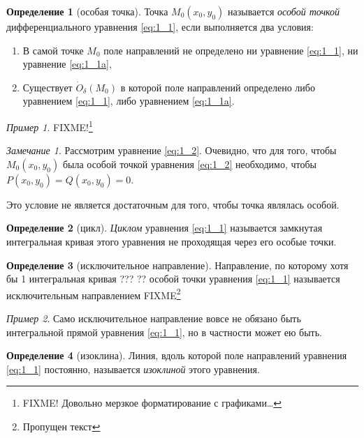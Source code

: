 \documentclass[a4paper,10pt]{report}
\newcommand{\new}[2]{\emph{#1}\index{#2}}
\theoremstyle{definition}
\newtheorem{definition}{Определение}[section]
\theoremstyle{remark}
\newtheorem{note}{Замечание}[section]
\newtheorem{example}{Пример}[section]
\theoremstyle{plain}
\begin{document}
\begin{definition}[особая точка]
 Точка $M_0(x_0,y_0)$ называется \new{особой точкой}{Особая точка} дифференциального уравнения \eqref{eq:1_1}, если выполняется два условия:
 \begin{enumerate}
  \item В самой точке $M_0$ поле направлений не определено ни уравнение \eqref{eq:1_1}, ни уравнение \eqref{eq:1_1a},
  \item Существует $\dot{O}_\delta(M_0)$ в которой поле направлений определено либо уравнением \eqref{eq:1_1}, либо уравнением \eqref{eq:1_1a}.
 \end{enumerate}
\end{definition}

\begin{example}
  FIXME!\footnote{FIXME! Довольно мерзкое форматирование с графиками\ldots}
\end{example}

\begin{note}
 Рассмотрим уравнение \eqref{eq:1_2}. Очевидно, что для того, чтобы $M_0(x_0,y_0)$ была особой точкой уравнения \eqref{eq:1_2} необходимо, чтобы $P(x_0,y_0) = Q(x_0,y_0) = 0$.

 Это условие не является достаточным для того, чтобы точка являлась особой.
\end{note}

\begin{definition}[цикл]
 \new{Циклом}{Цикл} уравнения \eqref{eq:1_1} называется замкнутая интегральная кривая этого уравнения не проходящая через его особые точки.
\end{definition}

\begin{definition}[исключительное направление]
 Направление, по которому хотя бы 1 интегральная кривая ??? ?? особой точки уравнения \eqref{eq:1_1} называется исключительным направлением FIXME\footnote{Пропущен текст}
\end{definition}

\begin{example}
 Само исключительное направление вовсе не обязано быть интегральной прямой уравнения \eqref{eq:1_1}, но в частности может ею быть.
\end{example}

\begin{definition}[изоклина]
 Линия, вдоль которой поле направлений уравнения \eqref{eq:1_1} постоянно, называется \new{изоклиной}{Изоклина} этого уравнения.
\end{definition}
\end{document}
